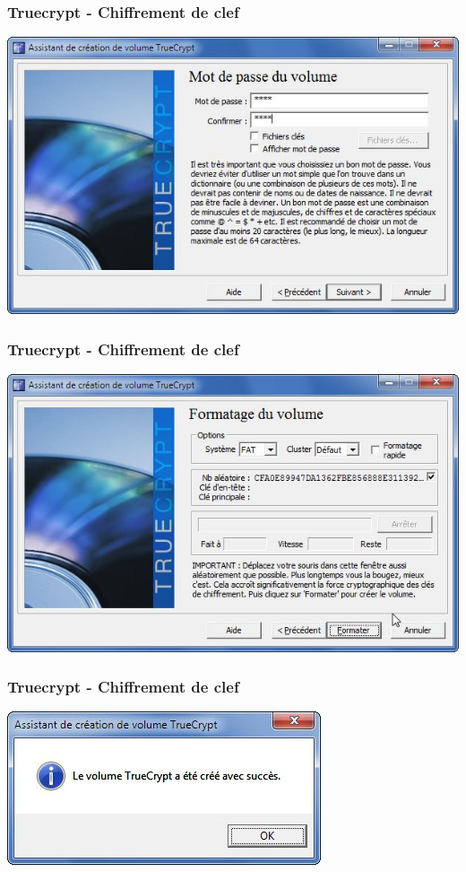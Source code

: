 \documentclass{beamer}
\begin{document}
\begin{frame}
\frametitle{Truecrypt - Chiffrement de clef}
\begin{center}
\includegraphics[scale=0.5] {./images/Truecrypt31.jpg} 
\end{center}
\end{frame}
\begin{frame}
\frametitle{Truecrypt - Chiffrement de clef}
\begin{center}
\includegraphics[scale=0.5] {./images/Truecrypt32.jpg} 
\end{center}
\end{frame}
\begin{frame}
\frametitle{Truecrypt - Chiffrement de clef}
\begin{center}
\includegraphics[scale=0.5] {./images/Truecrypt34.jpg} 
\end{center}
\end{frame}
\end{document}
